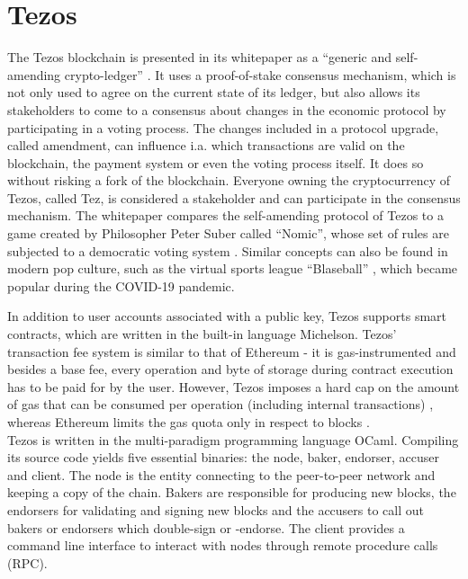 \section{Tezos}\label{sec:tezos}
The Tezos blockchain is presented in its whitepaper as a \enquote{generic and self-amending crypto-ledger} \cite{goodman_tezos_2014}. It uses a proof-of-stake consensus mechanism, which is not only used to agree on the current state of its ledger, but also allows its stakeholders to come to a consensus about changes in the economic protocol by participating in a voting process. The changes included in a protocol upgrade, called amendment, can influence i.a. which transactions are valid on the blockchain, the payment system or even the voting process itself. It does so without risking a fork of the blockchain. Everyone owning the cryptocurrency of Tezos, called Tez, is considered a stakeholder and can participate in the consensus mechanism. The whitepaper compares the self-amending protocol of Tezos to a game created by Philosopher Peter Suber called ``Nomic'', whose set of rules are subjected to a democratic voting system \cite{nomic}. Similar concepts can also be found in modern pop culture, such as the virtual sports league ``Blaseball'' \cite{blaseball}, which became popular during the COVID-19 pandemic.

In addition to user accounts associated with a public key, Tezos supports smart contracts, which are written in the built-in language Michelson. Tezos' transaction fee system is similar to that of Ethereum \cite{wood_ethereum_2021} - it is gas-instrumented and besides a base fee, every operation and byte of storage during contract execution has to be paid for by the user. However, Tezos imposes a hard cap on the amount of gas that can be consumed per operation (including internal transactions) \cite{tezos_docs}\cite{morley_repo}, whereas Ethereum limits the gas quota only in respect to blocks \cite{wood_ethereum_2021}.\\
Tezos is written in the multi-paradigm programming language OCaml. Compiling its source code yields five essential binaries: the  node, baker, endorser, accuser and client. The node is the entity connecting to the peer-to-peer network and keeping a copy of the chain. Bakers are responsible for producing new blocks, the endorsers for validating and signing new blocks and the accusers to call out bakers or endorsers which double-sign or -endorse. The client provides a command line interface to interact with nodes through remote procedure calls (RPC).

